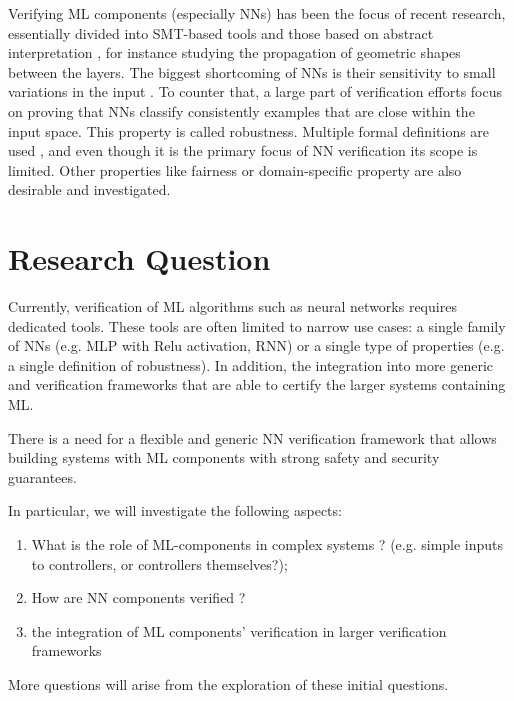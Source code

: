 \documentclass[]{article}
\begin{document}
Verifying ML components (especially NNs) has been the focus of recent research, essentially divided into SMT-based tools \cite{reluplex, etc.} and those based on abstract interpretation \cite{eran, etc.}, for instance studying the propagation of geometric shapes between the layers.
The biggest shortcoming of NNs is their sensitivity to small variations in the input \cite{Carlini}. To counter that, a large part of verification efforts focus on proving that NNs classify consistently examples that are close within the input space. This property is called robustness. Multiple formal definitions are used \cite{casadio}, and even though it is the primary focus of NN verification its scope is limited. Other properties like fairness or domain-specific property are also desirable and investigated.


\section{Research Question}
Currently, verification of ML algorithms such as neural networks requires dedicated tools. These tools are often limited to narrow use cases: a single family of NNs (e.g. MLP with Relu activation, RNN) or a single type of properties (e.g. a single definition of robustness). In addition, the integration into more generic and verification frameworks that are able to certify the larger systems containing ML.

There is a need for a flexible and generic NN verification framework that allows building systems with ML components with strong safety and security guarantees.

In particular, we will investigate the following aspects:
\begin{enumerate}
	\item What is the role of ML-components in complex systems ? (e.g. simple inputs to controllers, or controllers themselves?);
	\item How are NN components verified ?
	\item the integration of ML components' verification in larger verification frameworks
\end{enumerate}

More questions will arise from the exploration of these initial questions.
\end{document}
